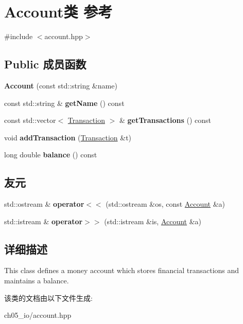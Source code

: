\hypertarget{class_account}{}\section{Account类 参考}
\label{class_account}


{\ttfamily \#include $<$account.\+hpp$>$}

\subsection*{Public 成员函数}
\begin{DoxyCompactItemize}
\item 
\mbox{\label{class_account_a81e627590e15fbe3e683e6ecd7c24e39}} 
{\bfseries Account} (const std\+::string \&name)
\item 
\mbox{\label{class_account_a193389d61d1a14590008a3dccebd4113}} 
const std\+::string \& {\bfseries get\+Name} () const
\item 
\mbox{\label{class_account_ad1717cdd85a7280ab4a24a16e3dc3dab}} 
const std\+::vector$<$ \mbox{\hyperlink{class_transaction}{Transaction}} $>$ \& {\bfseries get\+Transactions} () const
\item 
\mbox{\label{class_account_ac5ead7e97de0e4d034296208d5eab1b0}} 
void {\bfseries add\+Transaction} (\mbox{\hyperlink{class_transaction}{Transaction}} \&t)
\item 
\mbox{\label{class_account_a6148b1a22c0424044f4c121c3d337957}} 
long double {\bfseries balance} () const
\end{DoxyCompactItemize}
\subsection*{友元}
\begin{DoxyCompactItemize}
\item 
\mbox{\label{class_account_aa488f943940e192b2c1f3a010c644d7f}} 
std\+::ostream \& {\bfseries operator$<$$<$} (std\+::ostream \&os, const \mbox{\hyperlink{class_account}{Account}} \&a)
\item 
\mbox{\label{class_account_a209cc1cd91415f99ab30c830b7321c35}} 
std\+::istream \& {\bfseries operator$>$$>$} (std\+::istream \&is, \mbox{\hyperlink{class_account}{Account}} \&a)
\end{DoxyCompactItemize}


\subsection{详细描述}
This class defines a money account which stores financial transactions and maintains a balance. 

该类的文档由以下文件生成\+:\begin{DoxyCompactItemize}
\item 
ch05\+\_\+io/account.\+hpp\end{DoxyCompactItemize}
